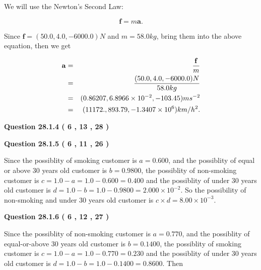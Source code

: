 \documentclass[12pt]{article}
\begin{document}
 

We will use the Newton's Second Law:
 
\[
\mathbf{f}=m\mathbf{a}.
\]
 
Since $\mathbf{f}=( %
50.0,  %
4.0,  %
-6000.0 )N$
and $m= %
58.0 kg$, bring them into the above equation, then we get
 
\begin{eqnarray*}
\mathbf{a}&=&\frac{\mathbf{f}}m  \\
&=&\frac{(
50.0 ,
4.0 ,
-6000.0 )N
}{ %
58.0 kg}  \\
&=&(
0.86207 ,
6.8966 \times 10^{-2},
-103.45
)ms^{-2} \\
&=&(
11172. ,
893.79 ,
-1.3407 \times 10^{6}
)km/h^2.
\end{eqnarray*}
 
 
 
  
\vspace{0.2in}
  
{\textbf{\Large{Question
28.1.4 
 (           6 ,          13 ,          28 )
}}}
  
  
  
\vspace{0.2in}
  
{\textbf{\Large{Question
28.1.5 
 (           6 ,          11 ,          26 )
}}}
  
  
 
 

Since the possiblity of  %
smoking customer is $ a =  %
0.600 $,
and the possiblity of  %
equal or above 30 years old customer is $ b =  %
0.9800 $,
the possiblity of  %
non-smoking customer is $ c = 1.0 - a = 1.0 -
0.600
=  %
0.400 $ and the possiblity of  %
under 30 years old
customer is $ d = 1.0 - b = 1.0 -  %
0.9800 =  %
2.000 \times 10^{-2}  $.
So the possibility of  %
 non-smoking and  %
under 30 years old
customer is $ c \times d =  %
8.00 \times 10^{-3} $.
 
 
 
  
\vspace{0.2in}
  
{\textbf{\Large{Question
28.1.6 
 (           6 ,          12 ,          27 )
}}}
  
  
 
 

Since the possiblity of  %
 non-smoking customer is $ a =  %
0.770 $,
and the possiblity of  %
equal-or-above 30 years old customer is $ b =  %
0.1400 $,
the possiblity of  %
smoking customer is $ c = 1.0 - a = 1.0 -
0.770
=  %
0.230 $ and the possiblity of  %
under 30 years old
customer is $ d = 1.0 - b = 1.0 -  %
0.1400 =  %
0.8600  $.
Then
 
\end{document}
